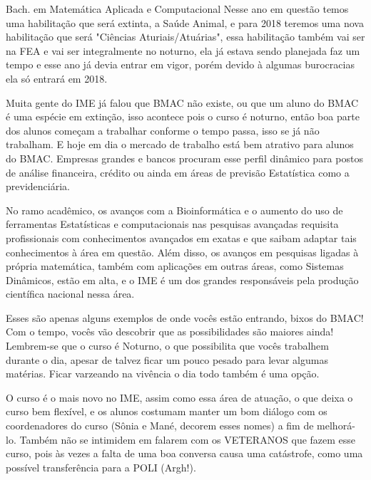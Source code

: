 \begin{subsecao}{Bach. em Matemática Aplicada e Computacional}
Nesse ano em questão temos uma habilitação que será extinta, a Saúde Animal,
e para 2018 teremos uma nova habilitação que será "Ciências Aturiais/Atuárias",
essa habilitação também vai ser na FEA e vai ser integralmente no noturno,
ela já estava sendo planejada faz um tempo e esse ano já devia entrar em vigor,
porém devido à algumas burocracias ela só entrará em 2018.

Muita gente do IME já falou que BMAC não existe, ou que um aluno do BMAC é uma
espécie em extinção, isso acontece pois o curso é noturno, então boa parte
dos alunos começam a trabalhar conforme o tempo passa, isso se já não trabalham.
E hoje em dia o mercado de trabalho está bem atrativo para alunos do BMAC.
Empresas grandes e bancos procuram esse perfil dinâmico para postos de análise
financeira, crédito ou ainda em áreas de previsão Estatística como a
previdenciária.

No ramo acadêmico, os avanços com a Bioinformática e o aumento do uso de
ferramentas Estatísticas e computacionais nas pesquisas avançadas requisita
profissionais com conhecimentos avançados em exatas e que saibam adaptar tais
conhecimentos à área em questão. Além disso, os avanços em pesquisas ligadas à
própria matemática, também com aplicações em outras áreas, como Sistemas
Dinâmicos, estão em alta, e o IME é um dos grandes responsáveis pela produção
científica nacional nessa área.

Esses são apenas alguns exemplos de onde vocês estão entrando, bixos do BMAC! Com o tempo,
vocês vão descobrir que as possibilidades são maiores ainda! Lembrem-se que o
curso é Noturno, o que possibilita que vocês trabalhem durante o dia, apesar de talvez
ficar um pouco pesado para levar algumas matérias. Ficar varzeando na vivência o dia todo
também é uma opção.

O curso é o mais novo no IME, assim como essa área de atuação, o que
deixa o curso bem flexível, e os alunos costumam manter um bom diálogo
com os coordenadores do curso (Sônia e Mané, decorem esses nomes) a fim de melhorá-lo.
Também não se intimidem em falarem com os VETERANOS que fazem esse curso, pois às
vezes a falta de uma boa conversa causa uma catástrofe, como uma possível
transferência para a POLI (Argh!).

\end{subsecao}
